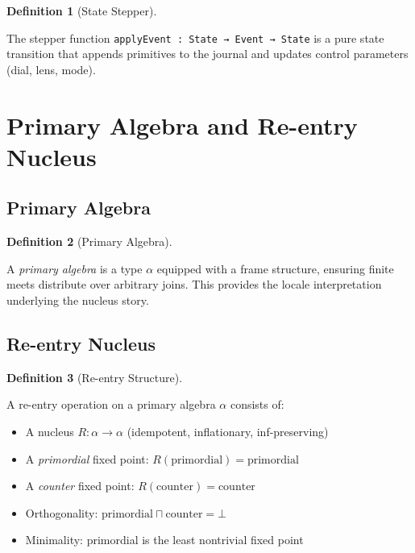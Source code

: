 \documentclass{amsart}
\theoremstyle{definition}
\newtheorem{definition}{Definition}[section]
\theoremstyle{remark}
\begin{document}
\begin{definition}[State Stepper]
\label{def:stepper}

The stepper function \texttt{applyEvent : State → Event → State} is a pure state transition that appends primitives to the journal and updates control parameters (dial, lens, mode).
\end{definition}

\section{Primary Algebra and Re-entry Nucleus}

\subsection{Primary Algebra}
\label{sec:primary-algebra}

\begin{definition}[Primary Algebra]
\label{def:primary-algebra}
\uses{}

A \emph{primary algebra} is a type $\alpha$ equipped with a frame structure, ensuring finite meets distribute over arbitrary joins. This provides the locale interpretation underlying the nucleus story.
\end{definition}

\subsection{Re-entry Nucleus}
\label{sec:nucleus}

\begin{definition}[Re-entry Structure]
\label{def:reentry}

A re-entry operation on a primary algebra $\alpha$ consists of:
\begin{itemize}
\item A nucleus $R : \alpha \to \alpha$ (idempotent, inflationary, inf-preserving)
\item A \emph{primordial} fixed point: $R(\text{primordial}) = \text{primordial}$
\item A \emph{counter} fixed point: $R(\text{counter}) = \text{counter}$
\item Orthogonality: $\text{primordial} \sqcap \text{counter} = \bot$
\item Minimality: primordial is the least nontrivial fixed point
\end{itemize}
\end{definition}
\end{document}
